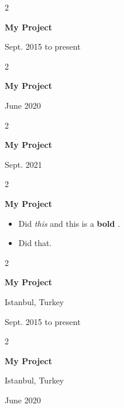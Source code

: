\documentclass[10pt, letterpaper]{article}
\newenvironment{highlights}{
    \begin{itemize}[
        topsep=0.10 cm,
        parsep=0.10 cm,
        partopsep=0pt,
        itemsep=0pt,
        leftmargin=0.4 cm + 10pt
    ]
}{
    \end{itemize}
            
    \vspace{-0.10cm}
} %
\newenvironment{twocolentry}[2][]{
    \onecolentry
    \def\secondColumn{#2}
    \setcolumnwidth{\fill, 4.1 cm}
    \begin{paracol}{2}
}{
    \switchcolumn \raggedleft \secondColumn
    \end{paracol}
    \endonecolentry
} %
\let\hrefWithoutArrow\href
\renewcommand{\href}[2]{\hrefWithoutArrow{#1}{\mbox{\ifthenelse{\equal{#2}{}}{ }{#2 }\raisebox{.15ex}{\footnotesize \faExternalLink*}}}}
\begin{document}
        \begin{twocolentry}{
            Sept. 2015 to present
        }
            \textbf{My Project}
        \end{twocolentry}


        \vspace{0.2 cm}

        \begin{twocolentry}{
            June 2020
        }
            \textbf{My Project}
        \end{twocolentry}


        \vspace{0.2 cm}

        \begin{twocolentry}{
            Sept. 2021
        }
            \textbf{My Project}
        \end{twocolentry}


        \vspace{0.2 cm}

        \begin{twocolentry}{
            
        }
            \textbf{My Project}
            \begin{highlights}
                \item Did \textit{this} and this is a \textbf{bold} \href{https://example.com}{link}.
                \item Did that.
            \end{highlights}
        \end{twocolentry}


        \vspace{0.2 cm}

        \begin{twocolentry}{
            Istanbul, Turkey

        Sept. 2015 to present
        }
            \textbf{My Project}
        \end{twocolentry}


        \vspace{0.2 cm}

        \begin{twocolentry}{
            Istanbul, Turkey

        June 2020
        }
            \textbf{My Project}
        \end{twocolentry}


        \vspace{0.2 cm}
\end{document}

